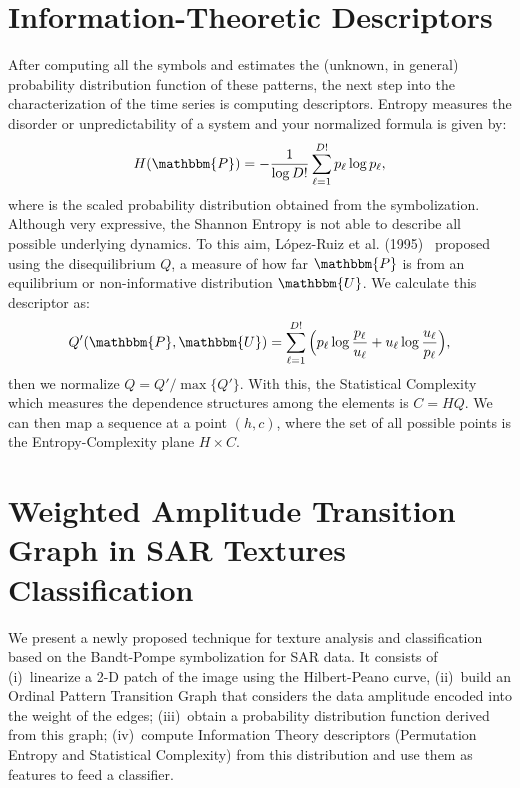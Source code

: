 \documentclass[a4,11pt]{pssbmac}
\begin{document}
\section{Information-Theoretic Descriptors}\label{HC}

After computing all the symbols and estimates the (unknown, in general) probability distribution function of these patterns, the next step into the characterization of the time series is computing descriptors.
Entropy measures the disorder or unpredictability of a system and your normalized formula is given by:	
\begin{equation}
H(\mathbbm{P}) = - \frac{1}{\log D!}\sum_{\ell = 1}^{D!} p_\ell \log p_\ell,
\label{eq:Entropia}
\end{equation}
where is the scaled probability distribution obtained from the symbolization.
Although very expressive, the Shannon Entropy is not able to describe all possible underlying dynamics.
To this aim, L\'opez-Ruiz et al. (1995)~\cite{LopezRuiz1995} proposed using the disequilibrium  $Q$, a measure of how far $\mathbbm{P}$ is from an equilibrium or non-informative distribution $\mathbbm{U}$.
We calculate this descriptor as:
\begin{equation}
	Q'(\mathbbm{P}, \mathbbm{U}) = \sum_{\ell=1}^{D!} \Big(p_\ell \log\frac{p_\ell}{u_\ell} +
	u_\ell \log\frac{u_\ell}{p_\ell}
	\Big),
\end{equation}
then we normalize $Q = Q'/\max\{Q'\}$.
With this, the Statistical Complexity which measures the dependence structures among the elements is $C = HQ$.
We can then map a sequence at a point $(h, c)$, where the set of all possible points is the Entropy-Complexity plane $H \times C$.

\section{Weighted Amplitude Transition Graph in SAR Textures Classification}\label{WATG}

We present a newly proposed technique for texture analysis and classification based on the Bandt-Pompe symbolization for SAR data.
It consists of
(i)~linearize a \mbox{2-D} patch of the image using the Hilbert-Peano curve,
(ii)~build an Ordinal Pattern Transition Graph that considers the data amplitude encoded into the weight of the edges;
(iii)~obtain a probability distribution function derived from this graph;
(iv)~compute Information Theory descriptors (Permutation Entropy and Statistical Complexity) from this distribution and use them as features to feed a classifier.
\end{document}
